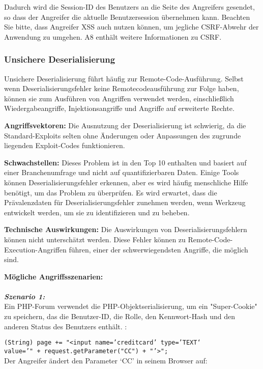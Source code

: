 Dadurch wird die Session-ID des Benutzers an die Seite des
Angreifers gesendet, so dass der Angreifer die aktuelle
Benutzersession übernehmen kann. Beachten Sie bitte, dass
Angreifer XSS auch nutzen können, um jegliche CSRF-Abwehr
der Anwendung zu umgehen. A8 enthält weitere
Informationen zu CSRF\cite[13]{owasp17top10}.

\subsubsection{Unsichere Deserialisierung}

Unsichere Deserialisierung führt häufig zur Remote-Code-Ausführung. Selbst wenn Deserialisierungsfehler keine Remotecodeausführung zur Folge haben, können sie zum Ausführen von Angriffen verwendet werden, einschließlich Wiedergabeangriffe, Injektionsangriffe und Angriffe auf erweiterte Rechte\cite[6]{owasp17top10}.

\textbf{Angriffsvektoren:} Die Ausnutzung der Deserialisierung ist schwierig, da die Standard-Exploits selten ohne Änderungen oder Anpassungen des zugrunde liegenden Exploit-Codes funktionieren\cite[14]{owasp17top10}.

\textbf{Schwachstellen:} Dieses Problem ist in den Top 10 enthalten und basiert auf einer Branchenumfrage und nicht auf quantifizierbaren Daten. Einige Tools können Deserialisierungsfehler erkennen, aber es wird häufig menschliche Hilfe benötigt, um das Problem zu überprüfen. Es wird erwartet, dass die Prävalenzdaten für Deserialisierungsfehler zunehmen werden, wenn Werkzeug entwickelt werden, um sie zu identifizieren und zu beheben\cite[14]{owasp17top10}.

\textbf{Technische Auswirkungen:} Die Auswirkungen von Deserialisierungsfehlern können nicht unterschätzt werden. Diese Fehler können zu Remote-Code-Execution-Angriffen führen, einer der schwerwiegendsten Angriffe, die möglich sind\cite[13]{owasp17top10}.

\textbf{Mögliche Angriffsszenarien:}\\
\\
\textbf{\textit{Szenario 1:}}\\
Ein PHP-Forum verwendet die PHP-Objektserialisierung, um ein "Super-Cookie" zu speichern, das die Benutzer-ID, die Rolle, den Kennwort-Hash und den anderen Status des Benutzers enthält. \cite[13]{owasp17top10}:

\texttt{(String) page += "<input name='creditcard' type='TEXT‘}\\
\texttt{value='" + request.getParameter("CC") + "'>";}\\
Der Angreifer ändert den Parameter ‘CC’ in seinem Browser
auf\cite[13]{owasp17top10}:

